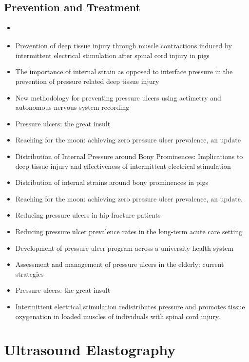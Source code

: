 		\subsection{Prevention and Treatment}
			\begin{itemize}
				\item \cite{solis12-02}
				\item Prevention of deep tissue injury through muscle contractions induced by intermittent electrical stimulation after spinal cord injury in pigs \cite{solis13}
				\item The importance of internal strain as opposed to interface pressure in the prevention of pressure related deep tissue injury \cite{oomens10}
				\item New methodology for preventing pressure ulcers using actimetry and autonomous nervous system recording \cite{meffre06}
				\item Pressure ulcers: the great insult \cite{maklebust05}
				\item Reaching for the moon: achieving zero pressure ulcer prevalence, an update \cite{bales11}
				\item Distribution of Internal Pressure around Bony Prominences: Implications to deep tissue injury and effectiveness of intermittent electrical stimulation \cite{solis12-02}
				\item Distribution of internal strains around bony prominences in pigs \cite{solis12-03}
				\item Reaching for the moon: achieving zero pressure ulcer prevalence, an update. \cite{bales11}
				\item Reducing pressure ulcers in hip fracture patients \cite{thompson11}
				\item Reducing pressure ulcer prevalence rates in the long-term acute care setting \cite{milne09}
				\item Development of pressure ulcer program across a university health system \cite{carson11}
				\item Assessment and management of pressure ulcers in the elderly: current strategies \cite{jaul10}
				\item Pressure ulcers: the great insult \cite{maklebust05}
				\item Intermittent electrical stimulation redistributes pressure and promotes tissue oxygenation in loaded muscles of individuals with spinal cord injury. \cite{gyawali11}
			\end{itemize}

	\section{Ultrasound Elastography}


